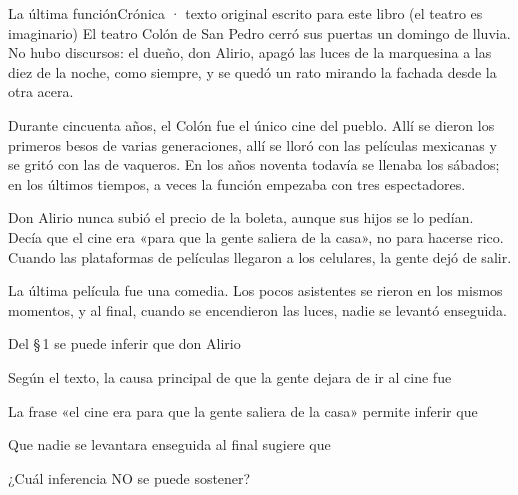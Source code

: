 \evaluacion
\begin{texto}{La última función}{Crónica · texto original escrito para este libro (el teatro es imaginario)}
\pa El teatro Colón de San Pedro cerró sus puertas un domingo de lluvia. No hubo discursos: el dueño, don Alirio, apagó
las luces de la marquesina a las diez de la noche, como siempre, y se quedó un rato mirando la fachada desde la otra
acera.

\pa Durante cincuenta años, el Colón fue el único cine del pueblo. Allí se dieron los primeros besos de varias
generaciones, allí se lloró con las películas mexicanas y se gritó con las de vaqueros. En los años noventa todavía se
llenaba los sábados; en los últimos tiempos, a veces la función empezaba con tres espectadores.

\pa Don Alirio nunca subió el precio de la boleta, aunque sus hijos se lo pedían. Decía que el cine era «para que la gente
saliera de la casa», no para hacerse rico. Cuando las plataformas de películas llegaron a los celulares, la gente dejó de
salir.

\pa La última película fue una comedia. Los pocos asistentes se rieron en los mismos momentos, y al final, cuando se
encendieron las luces, nadie se levantó enseguida.
\end{texto}
\begin{ejercicios}
\item Del \S\,1 se puede inferir que don Alirio
\item Según el texto, la causa principal de que la gente dejara de ir al cine fue
\item La frase «el cine era para que la gente saliera de la casa»  permite inferir que
\item Que nadie se levantara enseguida al final  sugiere que
\item ¿Cuál inferencia NO se puede sostener?
\end{ejercicios}
